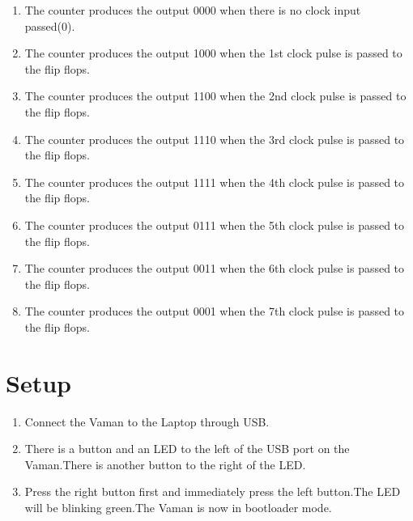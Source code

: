 \documentclass[journal,12pt,twocolumn]{IEEEtran}
\begin{document}
 \begin{enumerate}
 
\item The counter produces the output 0000 when there is no clock input passed(0).
\item  The counter produces the output 1000 when the 1st clock pulse is passed to the flip flops.
 \item  The counter produces the output 1100 when the 2nd clock pulse is passed to the flip flops. \item The counter produces the output 1110 when the 3rd clock pulse is passed to the flip flops.
\item The counter produces the output 1111 when the 4th clock pulse is  passed to the flip flops.
\item  The counter produces the output 0111 when the 5th clock pulse is passed to the flip flops.
\item The counter produces the output 0011 when the 6th clock pulse is passed to the flip flops.
\item The counter produces the output 0001 when the 7th clock pulse is passed to the flip flops.
 \end{enumerate}
 
 
 
\section{Setup}
\begin{enumerate}
\item Connect the Vaman to the Laptop through USB.
\item There is a button and an LED to the left of the USB port on the Vaman.There is another button to the right of the LED.
\item Press the right button first and immediately press the left button.The LED will be blinking green.The Vaman is now in bootloader mode.
\end{enumerate}
\end{document}

